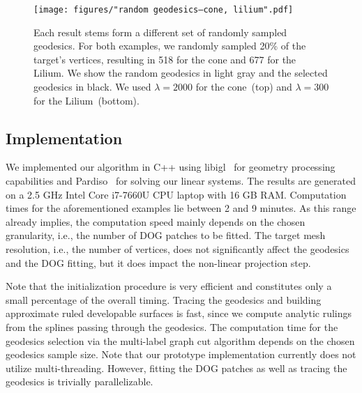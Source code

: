 \begin{figure} 
	\centering
	\noindent\texttt{[image: figures/"random geodesics--cone, lilium".pdf]}
	\caption{
        Each result stems form a different set of randomly sampled geodesics.
        For both examples, we randomly sampled 20\% of the target's vertices, resulting in 518 for the cone and 677 for the Lilium. We show the random geodesics in light gray and the selected geodesics in black. We used $\lambda=2000$ for the cone~(top) and $\lambda=300$ for the Lilium~(bottom). 
		\label{fig:compare_random_geodesics}}
\end{figure}




\subsection{Implementation}

We implemented our algorithm in C++ using libigl~\cite{libigl} for geometry processing capabilities and Pardiso~\cite{pardiso-6.0a, pardiso-6.0b, pardiso-6.0c} for solving our linear systems. The results are generated on a 2.5 GHz Intel Core i7-7660U CPU laptop with 16 GB RAM. 
Computation times for the aforementioned examples lie between 2 and 9 minutes. As this range already implies, the computation speed mainly depends on the chosen granularity, i.e., the number of DOG patches to be fitted. The target mesh resolution, i.e., the number of vertices, does not significantly affect the geodesics and the DOG fitting, but it does impact the non-linear projection step. 

Note that the initialization procedure is very efficient and constitutes only a small percentage of the overall timing. Tracing the geodesics and building approximate ruled developable surfaces is  fast, since we compute analytic rulings from the splines passing through the geodesics. The computation time for the geodesics selection via the multi-label graph cut algorithm depends on the chosen geodesics sample size.
Note that our prototype implementation currently does not utilize multi-threading. However, fitting the DOG patches as well as tracing the geodesics is trivially parallelizable. 






